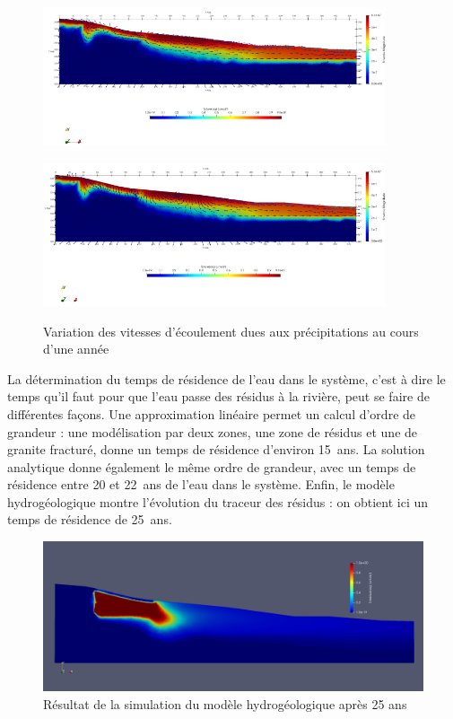 \documentclass{article}
\begin{document}
\begin{figure}[H]
    \centering
    \begin{minipage}{0.5\textwidth}
        \centering
        \includegraphics[width=0.9\textwidth]{III_B_3_6.png} 
        \label{fig:v_précipitations_ribiere_1}
    \end{minipage}\hfill
    \begin{minipage}{0.5\textwidth}
        \centering
        \includegraphics[width=0.9\textwidth]{III_B_3_7.png} 
        \label{fig:v_précipitations_ribiere_2}
    \end{minipage}
    \caption{Variation des vitesses d'écoulement dues aux précipitations au cours d'une année}
\end{figure}

La détermination du temps de résidence de l'eau dans le système, c'est à dire le temps qu'il faut pour que l'eau passe des résidus à la rivière, peut se faire de différentes façons. Une approximation linéaire permet un calcul d’ordre de grandeur : une modélisation par deux zones, une zone de résidus et une de granite fracturé, donne un temps de résidence d’environ 15~ans. La solution analytique donne également le même ordre de grandeur, avec un temps de résidence entre 20 et 22~ans de l'eau dans le système. Enfin, le modèle hydrogéologique montre l’évolution du traceur des résidus : on obtient ici un temps de résidence de 25~ans.

\begin{figure}[H]
    \centering
    \includegraphics[width=0.6\linewidth]{III_B_3_8.png}
    \caption{Résultat de la simulation du modèle hydrogéologique après 25 ans}
    \label{hytec_hydro_25ans}
\end{figure}
\end{document}
